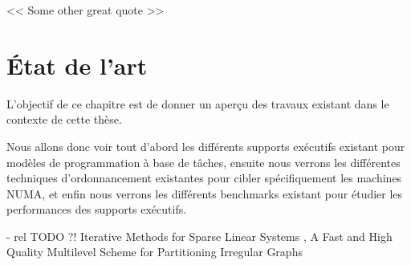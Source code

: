 
\begin{savequote}[6cm]
<< Some other great quote  >>
\end{savequote}
\chapter{État de l'art}\label{chap:rw}
\chaptertoc

L'objectif de ce chapitre est de donner un aperçu des travaux existant dans le contexte de cette thèse.

Nous allons donc voir tout d'abord les différents supports exécutifs existant pour modèles de programmation à base de tâches, ensuite nous verrons les différentes techniques d'ordonnancement existantes pour cibler spécifiquement les machines NUMA, et enfin nous verrons les différents benchmarks existant pour étudier les performances des supports exécutifs.






 - rel TODO ?!
\cite{Saad2013} Iterative Methods for Sparse Linear Systems
\cite{Karypis1998}, A Fast and High Quality Multilevel Scheme for Partitioning Irregular Graphs





